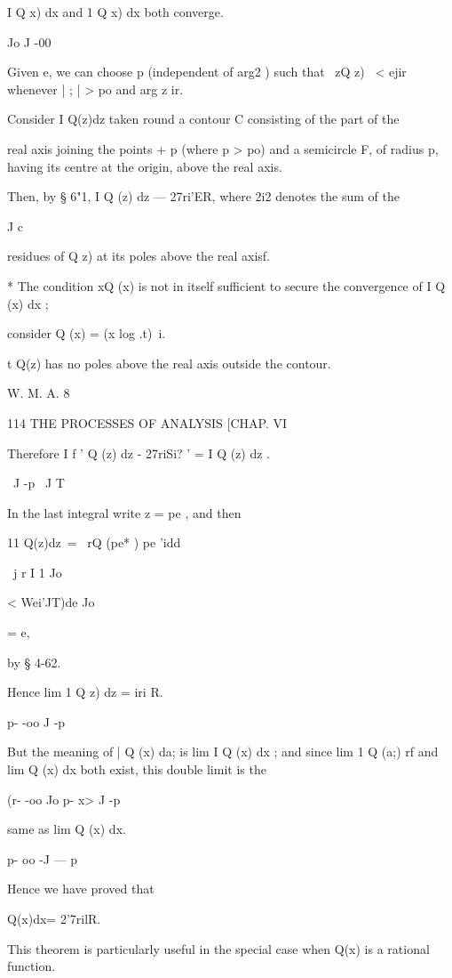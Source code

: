 I Q  x) dx and 1 Q  x) dx both converge. 

Jo J -00 

Given e, we can choose p  (independent of arg2 ) such that \ zQ z) \ < ejir 
whenever |  ; | > po and   arg z  ir. 

Consider I Q(z)dz taken round a contour C consisting of the part of the 

real axis joining the points + p (where p > po) and a semicircle F, of radius p, 
having its centre at the origin, above the real axis. 

Then, by § 6"1, I Q (z) dz — 27ri'ER, where 2i2 denotes the sum of the 

J c 

residues of Q z) at its poles above the real axisf. 

* The condition xQ (x)   is not in itself sufficient to secure the convergence of I Q (x) dx ; 

consider Q (x) = (x log .t)~i. 

t Q(z) has no poles above the real axis outside the contour. 

W. M. A. 8 



114 THE PROCESSES OF ANALYSIS [CHAP. VI 

Therefore I f ' Q (z) dz - 27riSi? ' = I Q (z) dz . 

\ J -p \ J T 

In the last integral write z = pe , and then 

11 Q(z)dz\ = \ rQ (pe* ) pe 'idd 

\ j r I 1 Jo 

< Wei'JT)de 
Jo 

= e, 

by § 4-62. 

Hence lim 1 Q  z) dz =  iri R. 

p- -oo J -p 

But the meaning of | Q (x) da; is lim I Q (x) dx ; and since 
lim 1 Q (a;) rf  and lim Q (x) dx both exist, this double limit is the 

(r- -oo Jo   p- x> J -p 

same as lim Q (x) dx. 

p- oo -J — p 

Hence we have proved that 

Q(x)dx= 2'7rilR. 



This theorem is particularly useful in the special case when Q(x) is a 
rational function. 

